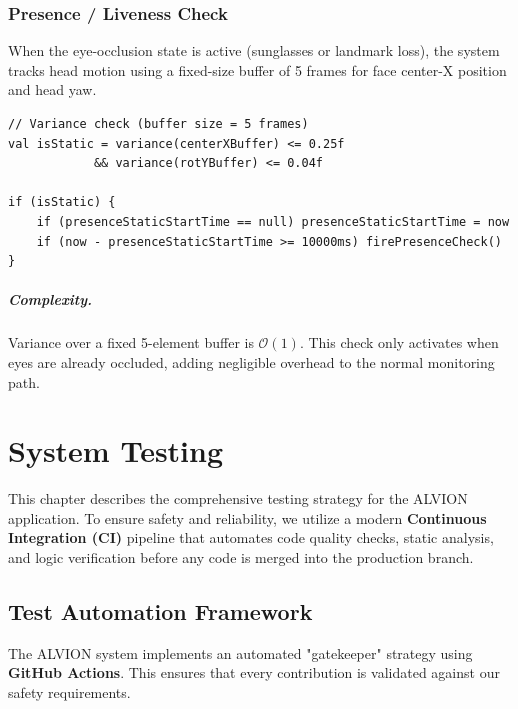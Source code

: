 \documentclass[11pt]{report}
\begin{document}
\subsection{Presence / Liveness Check}\label{subsec:presence-algo}
When the eye-occlusion state is active (sunglasses or landmark loss), the system tracks head motion using a fixed-size buffer of 5 frames for face center-X position and head yaw.

\begin{verbatim}
// Variance check (buffer size = 5 frames)
val isStatic = variance(centerXBuffer) <= 0.25f
            && variance(rotYBuffer) <= 0.04f

if (isStatic) {
    if (presenceStaticStartTime == null) presenceStaticStartTime = now
    if (now - presenceStaticStartTime >= 10000ms) firePresenceCheck()
}
\end{verbatim}

\paragraph{Complexity.}
Variance over a fixed 5-element buffer is $\mathcal{O}(1)$. This check only activates when eyes are already occluded, adding negligible overhead to the normal monitoring path.

\clearpage

\chapter{System Testing}
This chapter describes the comprehensive testing strategy for the ALVION application. To ensure safety and reliability, we utilize a modern \textbf{Continuous Integration (CI)} pipeline that automates code quality checks, static analysis, and logic verification before any code is merged into the production branch.

\section{Test Automation Framework}  %

The ALVION system implements an automated "gatekeeper" strategy using \textbf{GitHub Actions}. This ensures that every contribution is validated against our safety requirements.
\end{document}
